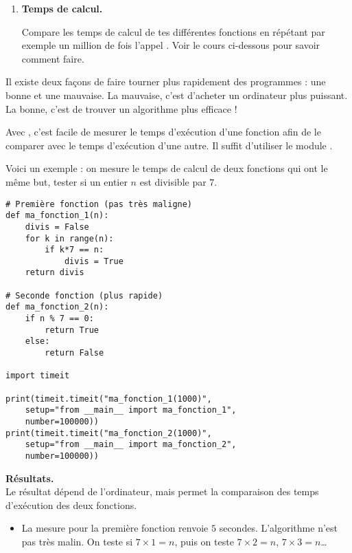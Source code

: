 \documentclass[11pt,class=report,crop=false]{standalone}
\begin{document}
\begin{activite}
\begin{enumerate}
  
  \item \textbf{Temps de calcul.}
  
  Compare les temps de calcul de tes différentes fonctions  en répétant par exemple un million de fois l'appel . Voir le cours ci-dessous pour savoir comment faire.
\end{enumerate}   
     
\end{activite}


\begin{cours}

Il existe deux façons de faire tourner plus rapidement des programmes : une bonne et une mauvaise. La mauvaise, c'est d'acheter un ordinateur plus puissant.
La bonne, c'est de trouver un algorithme plus efficace !

Avec \Python, c'est facile de mesurer le temps d'exécution d'une fonction afin de le comparer avec le temps d'exécution d'une autre. Il suffit d'utiliser le module .


Voici un exemple : on mesure le temps de calcul de deux fonctions qui ont le même but, tester si un entier $n$ est divisible par $7$.

\begin{lstlisting}  
# Première fonction (pas très maligne)
def ma_fonction_1(n):
    divis = False
    for k in range(n):
        if k*7 == n:
            divis = True
    return divis

# Seconde fonction (plus rapide)
def ma_fonction_2(n):
    if n % 7 == 0:
        return True
    else:
        return False

import timeit

print(timeit.timeit("ma_fonction_1(1000)", 
    setup="from __main__ import ma_fonction_1", 
    number=100000))
print(timeit.timeit("ma_fonction_2(1000)", 
    setup="from __main__ import ma_fonction_2", 
    number=100000))
\end{lstlisting} 


\textbf{Résultats.} \\
Le résultat dépend de l'ordinateur, mais permet la comparaison des temps d'exécution des deux fonctions.
\begin{itemize}
  \item La mesure pour la première fonction renvoie $5$ secondes. L'algorithme n'est pas très malin. On teste
  si $7\times 1 =n$, puis on teste $7\times 2 = n$, $7\times 3 = n$\ldots
  

\end{itemize}
\end{cours}
\end{document}
